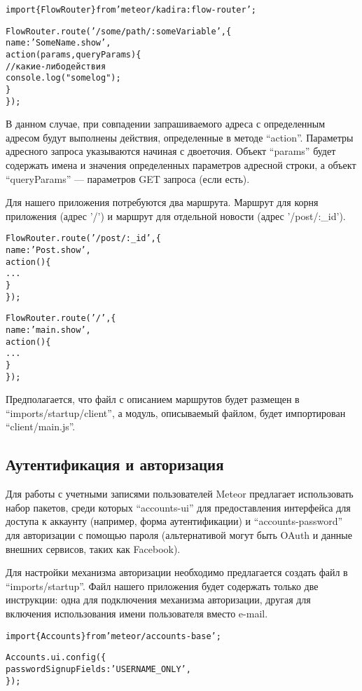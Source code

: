 \documentclass[a4paper,12pt]{article}
\begin{document}
\begin{alltt}
import \{ FlowRouter \} from 'meteor/kadira:flow-router';

FlowRouter.route('/some/path/:someVariable', \{
    name: 'SomeName.show',
    action(params, queryParams) \{
        // какие-либо действия
        console.log("some log");
    \}
\});
\end{alltt}

В данном случае, при совпадении запрашиваемого адреса с
определенным адресом будут выполнены действия, определенные
в методе ``action''. Параметры адресного запроса
указываются начиная с двоеточия. Объект ``params''
будет содержать имена и значения определенных параметров 
адресной строки, а объект ``queryParams'' ---
параметров GET запроса (если есть).

Для нашего приложения потребуются два маршрута.
Маршрут для корня приложения (адрес '/') и маршрут
для отдельной новости (адрес '/post/:\_id'). 

\begin{alltt}
FlowRouter.route('/post/:\_id', \{
    name: 'Post.show',
    action() \{  
        ...
    \}
\});

FlowRouter.route('/', \{
    name: 'main.show',
    action() \{  
        ...
    \}
\});
\end{alltt}

Предполагается, что файл с описанием маршрутов будет
размещен в ``imports/startup/client'', а модуль, описываемый
файлом, будет импортирован ``client/main.js''.

\subsection{Аутентификация и авторизация}
Для работы с учетными записями пользователей Meteor
предлагает использовать набор пакетов, среди которых
``accounts-ui'' для предоставления интерфейса для доступа
к аккаунту (например, форма аутентификации) и 
``accounts-password'' для авторизации с помощью пароля 
(альтернативой могут быть OAuth и данные внешних сервисов,
таких как Facebook).

Для настройки механизма авторизации необходимо предлагается
создать файл в ``imports/startup''. Файл нашего приложения будет
содержать только две инструкции: одна для подключения механизма
авторизации, другая для включения использования имени
пользователя вместо e-mail.

\begin{alltt}
import \{ Accounts \} from 'meteor/accounts-base';

Accounts.ui.config(\{
    passwordSignupFields: 'USERNAME\_ONLY',
\});
\end{alltt}
\end{document}
